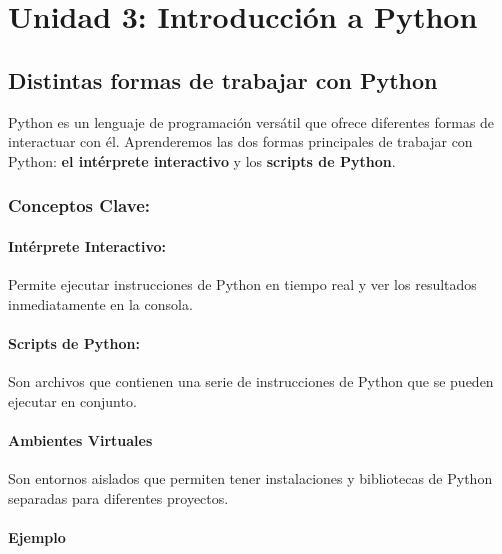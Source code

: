 \documentclass[
  a4paper,
  onepage,
  openany]{scrreprt}
\begin{document}
\part{Unidad 3: Introducción a Python}

\hypertarget{distintas-formas-de-trabajar-con-python}{%
\chapter{Distintas formas de trabajar con
Python}\label{distintas-formas-de-trabajar-con-python}}

Python es un lenguaje de programación versátil que ofrece diferentes
formas de interactuar con él. Aprenderemos las dos formas principales de
trabajar con Python: \textbf{el intérprete interactivo} y los
\textbf{scripts de Python}.

\hypertarget{conceptos-clave-3}{%
\section{Conceptos Clave:}\label{conceptos-clave-3}}

\hypertarget{intuxe9rprete-interactivo}{%
\subsection{Intérprete Interactivo:}\label{intuxe9rprete-interactivo}}

Permite ejecutar instrucciones de Python en tiempo real y ver los
resultados inmediatamente en la consola.

\hypertarget{scripts-de-python}{%
\subsection{Scripts de Python:}\label{scripts-de-python}}

Son archivos que contienen una serie de instrucciones de Python que se
pueden ejecutar en conjunto.

\hypertarget{ambientes-virtuales}{%
\subsection{Ambientes Virtuales}\label{ambientes-virtuales}}

Son entornos aislados que permiten tener instalaciones y bibliotecas de
Python separadas para diferentes proyectos.

\hypertarget{ejemplo-3}{%
\subsection{Ejemplo}\label{ejemplo-3}}
\end{document}
